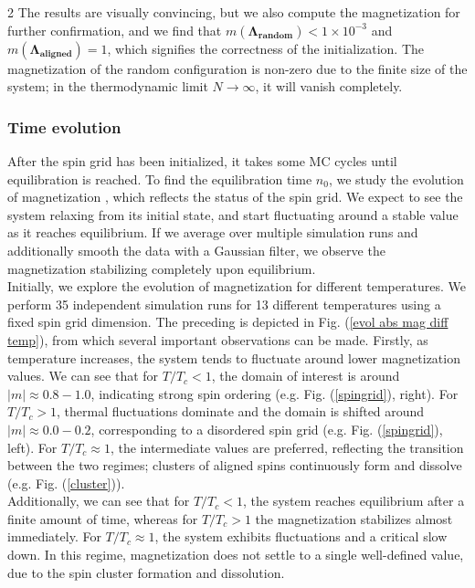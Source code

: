 \documentclass{article}
\begin{document}
\begin{multicols}{2}
The results are visually convincing, but we also compute the magnetization for further confirmation, and we find that $    m(\boldsymbol{\Lambda_\text{random}}) < 1\times10^{-3}$ and  $m(\boldsymbol{\Lambda_\text{aligned}}) = 1$, which signifies the correctness of the initialization. The magnetization of the random configuration is non-zero due to the finite size of the system; in the thermodynamic limit $N\to\infty$, it will vanish completely.


\subsubsection{Time evolution}
\label{sec_equilibrium}

After the spin grid has been initialized, it takes some MC cycles until equilibration is reached. To find the equilibration time $n_0$, we study the evolution of magnetization \cite{Jaschke}, which reflects the status of the spin grid. We expect to see the system relaxing from its initial state, and start fluctuating around a stable value as it reaches equilibrium. If we average over multiple simulation runs and additionally smooth the data with a Gaussian filter, we observe the magnetization stabilizing completely upon equilibrium. \\

Initially, we explore the evolution of magnetization for different temperatures. We perform 35 independent simulation runs for 13 different temperatures using a fixed spin grid dimension. The preceding is depicted in Fig. (\ref{evol abs mag diff temp}), from which several important observations can be made. Firstly, as temperature increases, the system tends to fluctuate around lower magnetization values. We can see that for $T/T_c<1$, the domain of interest is around $|m| \approx 0.8-1.0$, indicating strong spin ordering (e.g. Fig. (\ref{spingrid}), right). For $T/T_c>1$, thermal fluctuations dominate and the domain is shifted around $|m| \approx 0.0-0.2$, corresponding to a disordered spin grid (e.g. Fig. (\ref{spingrid}), left). For $T/T_c \approx 1$, the intermediate values are preferred, reflecting the transition between the two regimes; clusters of aligned spins continuously form and dissolve (e.g. Fig. (\ref{cluster})). \\

Additionally, we can see that for $T/T_c <1$, the system reaches equilibrium after a finite amount of time, whereas for $T/T_c > 1$ the magnetization stabilizes almost immediately. For $T/T_c \approx 1$, the system exhibits fluctuations and a critical slow down. In this regime, magnetization does not settle to a single well-defined value, due to the spin cluster formation and dissolution.


\end{multicols}
\end{document}
